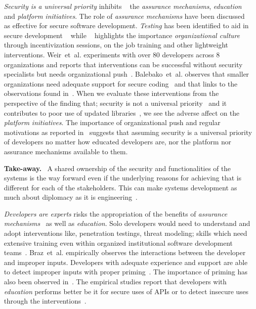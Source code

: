 \documentclass[conference]{IEEEtran}
\newenvironment{finding}{\begin{framed}\noindent\textbf{Take-away.}~}{\end{framed}}
\newcommand{\etal}[0]{et~al{.}}
\begin{document}
\emph{Security is a universal priority} inhibits ~\cite{witschey2015,weir2020,McGraw2018} the \emph{assurance mechanisms},  \emph{education} and \emph{platform initiatives}. The role of \emph{assurance mechanisms} have been discussed as effective for secure software development. \emph{Testing} has been identified to aid in secure development ~\cite{jose2016} while ~\cite{weir2020,haney2018,thomas2018} highlights the importance \emph{organizational culture} through incentivization sessions, on the job training and other lightweight interventions. Weir~\etal{} experiments with over 80 developers across 8 organizations and reports that interventions can be successful without security specialists but needs organizational push~\cite{weir2021,tondel2008}. Balebako~\etal{} observes that smaller organizations need adequate support for secure coding~\cite{balebako2014} and that links to the observations found in~\cite{weir2021}. When we evaluate these interventions from the perspective of the finding that; security is not a universal priority~\cite{acar2016,tahaei2019} and it contributes to poor use of updated libraries~\cite{vaniea2016}, we see the adverse affect on the \emph{platform initiatives}. The importance of organizational push and regular motivations as reported in~\cite{aside2012,weir2020,weir2021,adoption2014} suggests that assuming security is a universal priority of developers no matter how educated developers are, nor the platform nor assurance mechanisms available to them.

\begin{finding}
\noindent  
A shared ownership of the security and functionalities of the systems is the way forward even if the underlying reasons for achieving that is different for each of the stakeholders. This can make systems development as much about diplomacy as it is engineering~\cite{bruce2013}.   
\end{finding}

\emph{Developers are experts} risks the appropriation of the benefits of \emph{assurance mechanisms}~\cite{weir2020,hala2016} as well as \emph{education}. Solo developers would need to understand and adopt interventions like, penetration testings, threat modeling; skills which need extensive training even within organized institutional software development teams~\cite{weir2020}. 
Braz~\etal{} empirically observes the interactions between the developer and improper inputs. Developers with adequate experience and support are able to detect improper inputs with proper priming~\cite{braz2021}. The importance of priming has also been observed in~\cite{joseph2021,thomas2018}. The empirical studies report that developers with \emph{education} performs better be it for secure uses of APIs or to detect insecure uses through the interventions~\cite{madiha2017,naiakshina2018,zhu2014}.
\end{document}
